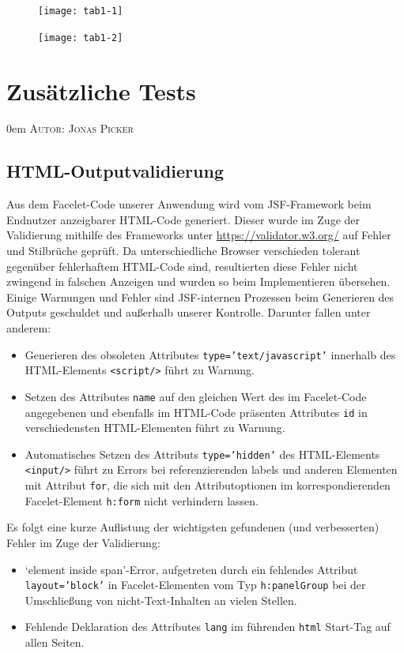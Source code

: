 \documentclass{article}
\makeatletter
\newcommand{\sectionauthor}[1]{
	{\parindent 0em \large \scshape Autor: #1 \par \nobreak \vspace*{1em}}
	\@afterheading
}
\makeatother
\begin{document}
\begin{figure}[h]
    \centering
    \texttt{[image: tab1-1]}
\end{figure}
\restoregeometry

\newpage

\begin{figure}[h]
    \centering
    \texttt{[image: tab1-2]}
\end{figure}
\restoregeometry

\newpage

\section{Zusätzliche Tests}
\sectionauthor{Jonas Picker}
\subsection{HTML-Outputvalidierung}
Aus dem Facelet-Code unserer Anwendung wird vom JSF-Framework beim Endnutzer anzeigbarer HTML-Code generiert. Dieser wurde im Zuge der Validierung mithilfe des Frameworks unter  \url{https://validator.w3.org/} auf Fehler und Stilbrüche geprüft. Da unterschiedliche Browser verschieden tolerant gegenüber fehlerhaftem HTML-Code sind, resultierten diese Fehler nicht zwingend in falschen Anzeigen und wurden so beim Implementieren übersehen. Einige Warnungen und Fehler sind JSF-internen Prozessen beim Generieren des Outputs geschuldet und außerhalb unserer Kontrolle. Darunter fallen unter anderem:
\begin{itemize}
\item Generieren des obsoleten Attributes \texttt{type='text/javascript'} innerhalb des HTML-Elements \texttt{<script/>} führt zu Warnung.
\item Setzen des Attributes \texttt{name} auf den gleichen Wert des im Facelet-Code angegebenen und ebenfalls im HTML-Code präsenten Attributes \texttt{id} in verschiedensten HTML-Elementen führt zu Warnung.
\item Automatisches Setzen des Attributs \texttt{type='hidden'} des HTML-Elements \texttt{<input/>} führt zu Errors bei referenzierenden labels und anderen Elementen mit Attribut \texttt{for}, die sich mit den Attributoptionen im korrespondierenden Facelet-Element \texttt{h:form} nicht verhindern lassen.
\end{itemize}
Es folgt eine kurze Auflistung der wichtigsten gefundenen (und verbesserten) Fehler im Zuge der Validierung:
\begin{itemize}
\item `element inside span'-Error, aufgetreten durch ein fehlendes Attribut \texttt{layout='block'} in Facelet-Elementen vom Typ \texttt{h:panelGroup} bei der Umschließung von nicht-Text-Inhalten an vielen Stellen.
\item Fehlende Deklaration des Attributes \texttt{lang} im führenden \texttt{html} Start-Tag auf allen Seiten.
\end{itemize}
\end{document}

